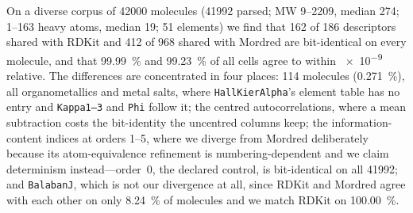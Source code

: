 
On a diverse corpus of \num{42000} molecules (\num{41992} parsed; MW \numrange{9}{2209},
median \num{274}; \numrange{1}{163} heavy atoms, median \num{19}; \num{51} elements) we
find that \num{162} of \num{186} descriptors shared with RDKit and \num{412} of \num{968}
shared with Mordred are bit-identical on every molecule, and that \qty{99.99}{\percent}
and \qty{99.23}{\percent} of all cells agree to within \num{e-9} relative. The differences
are concentrated in four places: \num{114} molecules (\qty{0.271}{\percent}), all
organometallics and metal salts, where \texttt{HallKierAlpha}'s element table has no entry
and \texttt{Kappa1--3} and \texttt{Phi} follow it; the centred autocorrelations, where a
mean subtraction costs the bit-identity the uncentred columns keep; the information-content
indices at orders \numrange{1}{5}, where we diverge from Mordred deliberately because its
atom-equivalence refinement is numbering-dependent and we claim determinism
instead---order~\num{0}, the declared control, is bit-identical on all \num{41992}; and
\texttt{BalabanJ}, which is not our divergence at all, since RDKit and Mordred agree with
each other on only \qty{8.24}{\percent} of molecules and we match RDKit on
\qty{100.00}{\percent}.
